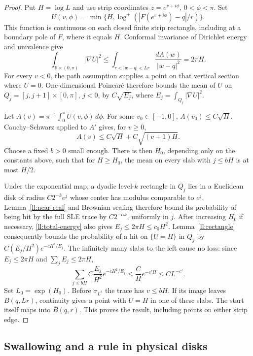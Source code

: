 \documentclass[11pt]{article}
\theoremstyle{definition}
\theoremstyle{remark}
\numberwithin{equation}{section}
\begin{document}
\begin{proof}
Put $H=\log L$ and use strip coordinates $z=e^{v+i\phi}$,
$0<\phi<\pi$. Set
\[
 U(v,\phi)=\min\{H,\log^+(|F(e^{v+i\phi})-q|/r)\}.
\]
This function is continuous on each closed finite strip rectangle,
including at a boundary pole of $F$, where it equals $H$.
Conformal invariance of Dirichlet energy and univalence give
\begin{equation}
 \int_{\mathbb R\times(0,\pi)}|\nabla U|^2
 \le\int_{r<|w-q|<Lr}\frac{dA(w)}{|w-q|^2}
 =2\pi H.
 \label{ll:total-energy}
\end{equation}
For every $v<0$, the path assumption supplies a point on that
vertical section where $U=0$. One-dimensional Poincar\'e therefore
bounds the mean of $U$ on
$Q_j=[j,j+1]\times[0,\pi]$, $j<0$, by $C\sqrt{E_j}$, where
$E_j=\int_{Q_j}|\nabla U|^2$.

Let $A(v)=\pi^{-1}\int_0^\pi U(v,\phi)\,d\phi$.
For some $v_0\in[-1,0]$, $A(v_0)\le C\sqrt H$.
Cauchy--Schwarz applied to $A'$ gives, for $v\ge0$,
\[
 A(v)\le C\sqrt H+C\sqrt{(v+1)H}.
\]
Choose a fixed $b>0$ small enough.  There is then $H_0$, depending only
on the constants above, such that for $H\ge H_0$,
the mean on every slab with $j\le bH$ is at most $H/2$.

Under the exponential map, a dyadic level-$k$ rectangle in $Q_j$
lies in a Euclidean disk of radius $C2^{-k}e^j$ whose center has
modulus comparable to $e^j$. Lemma~\ref{ll:near-real} and Brownian
scaling therefore bound its probability of being hit by the full
SLE trace by $C2^{-\alpha k}$, uniformly in $j$.
After increasing $H_0$ if necessary, \eqref{ll:total-energy} also gives
$E_j\le2\pi H\le c_0H^2$.
Lemma~\ref{ll:rectangle} consequently bounds the probability of a
hit on $\{U=H\}$ in $Q_j$ by
$C(E_j/H^2)e^{-cH^2/E_j}$.
The infinitely many slabs to the left cause no loss: since
$E_j\le2\pi H$ and $\sum_jE_j\le2\pi H$,
\[
 \sum_{j\le bH}C\frac{E_j}{H^2}e^{-cH^2/E_j}
 \le\frac C H e^{-c'H}\le CL^{-c'}.
\]
Set $L_0=\exp(H_0)$. Before $\sigma_{L^b}$ the trace has $v\le bH$.
If its image leaves
$B(q,Lr)$, continuity gives a point with $U=H$ in one of these
slabs. The start itself maps into $\overline B(q,r)$.
This proves the result, including points on either strip edge.
\end{proof}

\subsection{Swallowing and a rule in physical disks}
\end{document}
